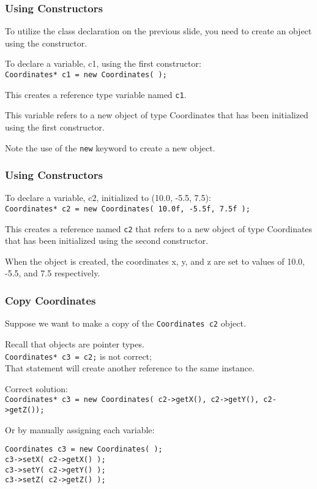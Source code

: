 \begin{frame}
\frametitle{Using Constructors}

To utilize the class declaration on the previous slide, you need to create an object using the constructor.

To declare a variable, c1, using the first constructor:\\
\quad \texttt{Coordinates* c1 = new Coordinates( );}

This creates a reference type variable named \texttt{c1}.

This variable refers to a new object of type Coordinates that has been initialized using the first constructor.

Note the use of the \texttt{new} keyword to create a new object.

\end{frame}

\begin{frame}
\frametitle{Using Constructors}
To declare a variable, c2, initialized to (10.0, -5.5, 7.5):\\
\texttt{Coordinates* c2 = new Coordinates( 10.0f, -5.5f, 7.5f );}

This creates a reference named \texttt{c2} that refers to a new object of type Coordinates that has been initialized using the second constructor.

When the object is created, the coordinates x, y, and z are set to values of 10.0, -5.5, and 7.5 respectively.

\end{frame}

\begin{frame}[fragile]
\frametitle{Copy Coordinates}
Suppose we want to make a copy of the \texttt{Coordinates c2} object.

Recall that objects are pointer types. \\
\quad \texttt{Coordinates* c3 = c2;} is not correct; \\
\quad That statement will create another reference to the same instance.

Correct solution:\\
\quad \texttt{Coordinates* c3 = new Coordinates( c2->getX(), c2->getY(), c2->getZ());}


Or by manually assigning each variable:
\begin{verbatim}
Coordinates c3 = new Coordinates( );
c3->setX( c2->getX() );
c3->setY( c2->getY() );
c3->setZ( c2->getZ() );
\end{verbatim}

\end{frame}

